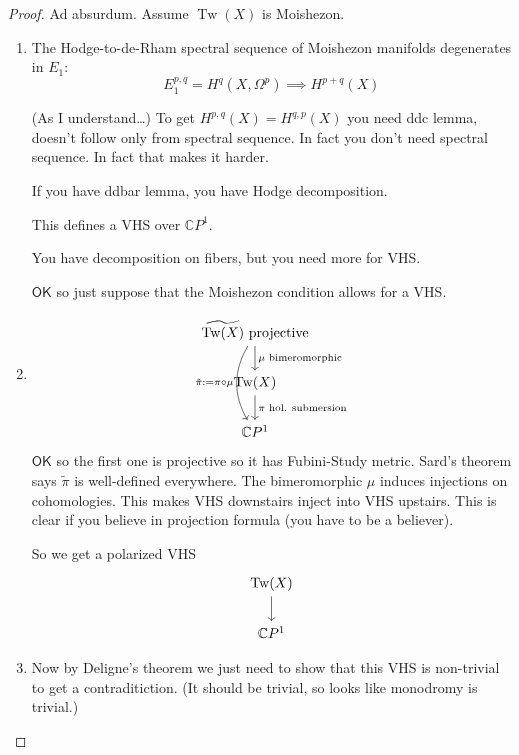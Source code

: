 \begin{proof}\leavevmode
	Ad absurdum. Assume $\operatorname{Tw}(X)$ is Moishezon. 

	\begin{enumerate}[label=\textbf{Step \arabic*}]
		\item The Hodge-to-de-Rham spectral sequence of Moishezon manifolds degenerates in $E_1$:
\[E^{p,q}_1=H^{q}(X,\Omega^p)\implies H^{p+q}(X)\]
\begin{remark}[Misha]\leavevmode
	(As I understand…)	To get $H^{p,q}(X)=H^{q,p}(X)$ you need ddc lemma, doesn't follow only from spectral sequence. In fact you don't need spectral sequence. In fact that makes it harder.
\end{remark}

\begin{remark}[Mitia]\leavevmode
	If you have ddbar lemma, you have Hodge decomposition.
\end{remark}
	This defines a VHS over $\mathbb{C}P^{1}$.

\begin{remark}[André]\leavevmode
	You have decomposition on fibers, but you need more for VHS.
\end{remark}

$\mathsf{OK}$ so just suppose that the Moishezon condition allows for a VHS.

\item 
\[\begin{tikzcd}
\widetilde{\operatorname{Tw}(X)}\text{ projective} \arrow[d,"\mu\text{ bimeromorphic} "]\arrow[dd,bend right,swap,"\tilde{\pi}:=\pi\circ \mu"]\\
\operatorname{Tw}(X)\arrow[d,"\pi\text{ hol. submersion} "]\\
\mathbb{C}P^{1}
\end{tikzcd}\]
$\mathsf{OK}$ so the first one is projective so it has Fubini-Study metric. Sard's theorem says $\tilde{\pi}$ is well-defined everywhere. {\color{2}The bimeromorphic $\mu$ induces injections on cohomologies. This makes VHS downstairs inject into VHS upstairs.} This is clear if you believe in projection formula (you have to be a believer).

So we get a polarized VHS
\[\begin{tikzcd}
\operatorname{Tw}(X)\arrow[d]\\
\mathbb{C}P^{1}
\end{tikzcd}\]

\item Now by Deligne's theorem we just need to show that this VHS is non-trivial to get a contraditiction. (It should be trivial, so looks like monodromy is trivial.)


\end{enumerate}
\end{proof}
